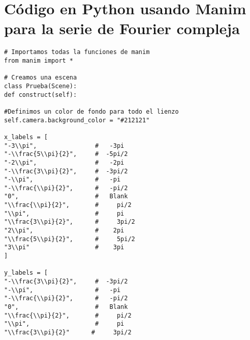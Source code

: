 \section{Código en Python usando Manim para la serie de Fourier compleja} \label{app3:complex-code-python-manim}
\begin{longlisting}
	\begin{verbatim}
# Importamos todas la funciones de manim
from manim import *

# Creamos una escena
class Prueba(Scene):
def construct(self):

#Definimos un color de fondo para todo el lienzo
self.camera.background_color = "#212121" 

x_labels = [
"-3\\pi",                #   -3pi
"-\\frac{5\\pi}{2}",     #  -5pi/2
"-2\\pi",                #   -2pi
"-\\frac{3\\pi}{2}",     #  -3pi/2
"-\\pi",                 #   -pi
"-\\frac{\\pi}{2}",      #   -pi/2
"0",                     #   Blank
"\\frac{\\pi}{2}",       #     pi/2
"\\pi",                  #     pi
"\\frac{3\\pi}{2}",      #     3pi/2
"2\\pi",                 #    2pi
"\\frac{5\\pi}{2}",      #     5pi/2
"3\\pi"                  #    3pi
]

y_labels = [
"-\\frac{3\\pi}{2}",     #  -3pi/2
"-\\pi",                 #   -pi
"-\\frac{\\pi}{2}",      #   -pi/2
"0",                     #   Blank
"\\frac{\\pi}{2}",       #     pi/2
"\\pi",                  #     pi
"\\frac{3\\pi}{2}"      #     3pi/2


\end{verbatim}
\end{longlisting}
